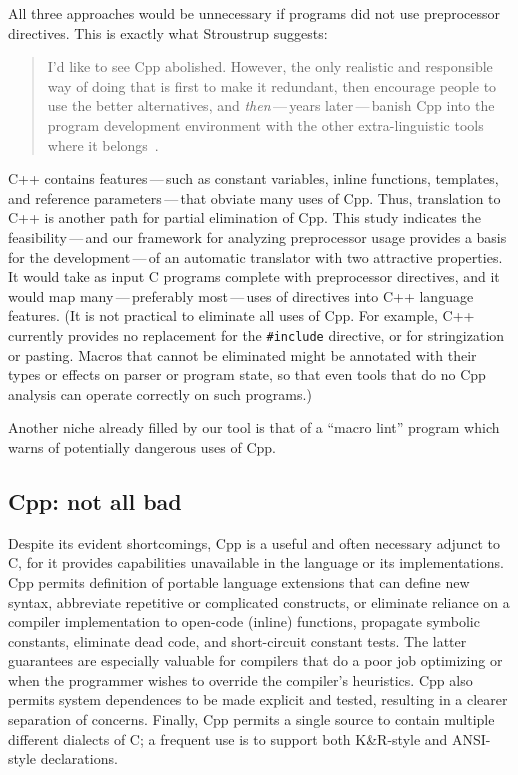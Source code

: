 \documentclass[11pt]{article}
\begin{document}
All three approaches would be unnecessary if programs did not use
preprocessor directives.  This is exactly what Stroustrup suggests:
\begin{quote}
  I'd like to see Cpp abolished.  However, the only realistic and
  responsible way of doing that is first to make it redundant, then
  encourage people to use the better alternatives, and {\em then\/}\,---\,years
  later\,---\,banish Cpp into the program development environment with the
  other extra-linguistic tools where it
  belongs~\cite[p.~426]{Stroustrup-DesignEvolution}.
\end{quote}
C++ contains features\,---\,such as constant variables, inline functions,
templates, and reference parameters\,---\,that obviate many uses of Cpp.
Thus, translation to C++ is another path for partial elimination of Cpp.
This study indicates the
feasibility\,---\,and our framework for analyzing preprocessor usage
provides a basis for the development\,---\,of an automatic translator with
two attractive properties.  It would take as input C programs complete with
preprocessor directives, and it would map many\,---\,preferably
most\,---\,uses of directives into C++ language features.  (It is not
practical to eliminate all uses of Cpp.  For example, C++ currently
provides no replacement for the {\tt \#include} directive, or for
stringization or pasting.  Macros that cannot be eliminated might be
annotated with their types or 
effects on parser or program state, so that even tools that do no Cpp
analysis can operate correctly on such programs.)

Another niche already filled by our tool is that of a ``macro lint''
program which warns of potentially dangerous uses of Cpp.



\subsection{Cpp: not all bad}

Despite its evident shortcomings, Cpp is a useful and often necessary
adjunct to C, for it provides capabilities unavailable in the language or
its implementations.  Cpp permits definition of portable language
extensions that can define new syntax, abbreviate repetitive or complicated
constructs, or eliminate reliance on a compiler implementation to
open-code (inline) functions, propagate symbolic constants, eliminate dead
code, and short-circuit constant tests.  The latter guarantees are
especially valuable for compilers that do a poor job optimizing or when the
programmer wishes to override the compiler's heuristics.  Cpp also permits
system dependences to be made explicit and tested, resulting in a clearer
separation of concerns.  Finally, Cpp permits a single source to contain
multiple different dialects of C; a frequent use is to support both
K\&R-style and ANSI-style declarations.
\end{document}
